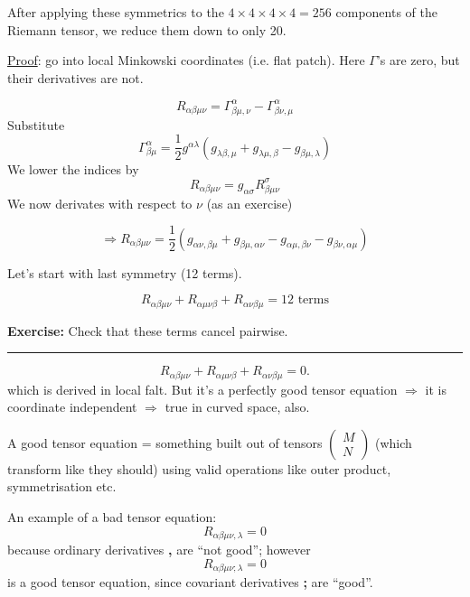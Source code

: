\documentclass[a4paper]{article} %
\newcommand{\exercise}[2]
{
\begin{framed}
\textbf{Exercise:} #1 \\\hrule
#2
\end{framed}
}
\newcommand{\pmx}[1]{
\begin{pmatrix}
#1
\end{pmatrix}
}
\begin{document}
After applying these symmetrics to the $4\times 4 \times 4 \times 4=256$ components of the Riemann tensor, we reduce them down to only 20.


\underline{Proof}: go into local Minkowski coordinates (i.e. flat patch). Here $\Gamma$'s are zero, but their derivatives are not.

\begin{equation}
R_{\alpha\beta\mu \nu}=\Gamma^{\alpha}_{\beta \mu , \nu} - \Gamma^{\alpha}_{\beta \nu , \mu}
\end{equation}
Substitute
\begin{equation}
\Gamma^{\alpha}_{\beta \mu}=\frac{1}{2}g^{\alpha \lambda}\left(g_{\lambda \beta, \mu} + g_{\lambda \mu, \beta} 
- g_{\beta\mu , \lambda}\right)
\end{equation}
We lower the indices by
\begin{equation}
R_{\alpha \beta \mu \nu} = g_{\alpha\sigma} R^{\sigma}_{\beta \mu \nu}
\end{equation}
We now derivates with respect to $\nu$ (as an exercise)

\begin{equation}
\Rightarrow R_{\alpha\beta\mu\nu}=\frac{1}{2}\left(g_{\alpha \nu, \beta \mu} + g_{\beta \mu,\alpha \nu}
-g_{\alpha \mu, \beta \nu} - g_{\beta \nu, \alpha \mu}\right)
\end{equation}

Let's start with last symmetry (12 terms).

\begin{equation}
R_{\alpha \beta \mu \nu} + R_{\alpha \mu \nu \beta} + R_{\alpha \nu \beta \mu} = \text{12 terms}
\end{equation}
\exercise{Check that these terms cancel pairwise.}{}

\begin{equation}
R_{\alpha \beta \mu \nu} + R_{\alpha \mu \nu \beta} + R_{\alpha \nu \beta \mu} = 0.
\end{equation}
which is derived in local falt. But it's a perfectly good tensor equation $\Rightarrow$ it is coordinate independent $\Rightarrow$ true in curved space, also.

A good tensor equation = something built out of tensors $\pmx{M\\N}$ (which transform like they should) using valid operations like outer product, symmetrisation etc.

An example of a bad tensor equation:
\begin{equation}
R_{\alpha \beta \mu \nu , \lambda}=0
\end{equation}
because ordinary derivatives \textbf{,} are ``not good''; however
\begin{equation}
R_{\alpha \beta \mu \nu ; \lambda}=0
\end{equation}
is a good tensor equation, since covariant derivatives \textbf{;} are ``good''.
\end{document}
